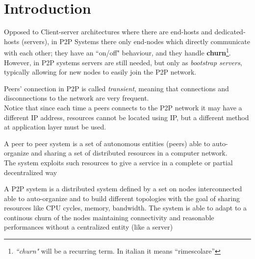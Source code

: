 \chapter{Introduction}

Opposed to Client-server architectures where there are end-hosts and dedicated-hosts (servers),
in P2P Systems there only end-nodes which directly communicate with each other;
they have an ``on/off" behaviour, and they handle \textbf{churn}\footnote{\textit{``churn"} will be a recurring term. In italian it means ``rimescolare'' }.
However, in P2P systems servers are still needed, but only as \textit{bootstrap servers}, typically allowing for new nodes to easily join the P2P network.

Peers' connection in P2P is called \textit{transient}, meaning that connections and disconnections to the network are very frequent.\\
Notice that since each time a peers connects to the P2P network it may have a different IP address, resources cannot be located using IP, but a different method at application layer must be used.

\begin{definition} [P2P System]
   A peer to peer system is a set of autonomous entities (peers) able to auto-organize and sharing a set of distributed resources in a computer network.\\
   The system exploits such resources to give a service in a complete or partial
   decentralized way
\end{definition}

\begin{definition}
   A P2P system is a distributed system defined by a set on nodes interconnected
   able to auto-organize and to build different topologies with the goal of sharing
   resources like CPU cycles, memory, bandwidth. The system is able to adapt to
   a continous churn of the nodes maintaining connectivity and reasonable
   performances without a centralized entity (like a server)
\end{definition}

